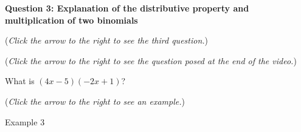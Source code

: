 \documentclass{ximera}
\begin{document}
\textbf{Question 3: Explanation of the distributive property and multiplication of two binomials}
\begin{question}
\begin{flushright}
{\color{blue}(\emph{Click the arrow to the right to see the third question.}) }
\end{flushright}
\begin{center}
\begin{expandable}
\begin{flushright}
{\color{blue}(\emph{Click the arrow to the right to see the question
posed at the end of the video.})}
\end{flushright}
\begin{expandable}
What is $(4x-5)(-2x+1)$?
\begin{multipleChoice}
\end{multipleChoice}
\begin{flushright}
{\color{blue}(\emph{Click the arrow to the right to see an example.})}
\end{flushright}
\begin{expandable}
\begin{center}
Example 3
\end{center}
\end{expandable}
\end{expandable}
\end{expandable}
\end{center}
\end{question}
\end{document}
